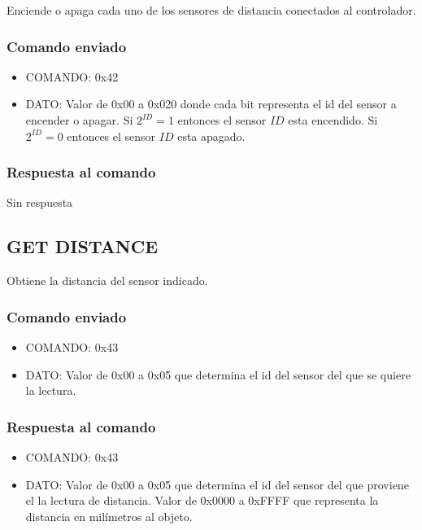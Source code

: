 \documentclass[a4paper,10pt]{article}
\begin{document}
Enciende o apaga cada uno de los sensores de distancia conectados al controlador.

\subsubsection*{Comando enviado}

\begin{itemize}
	\item{COMANDO:} 0x42
	\item{DATO:} Valor de 0x00 a 0x020 donde cada bit representa el id del sensor a encender o apagar.
	Si $2^{ID} = 1$ entonces el sensor $ID$ esta encendido.
	Si $2^{ID} = 0$ entonces el sensor $ID$ esta apagado.
\end{itemize}

\subsubsection*{Respuesta al comando}

Sin respuesta

\subsection{GET DISTANCE}
\label{get_distance_ds}

Obtiene la distancia del sensor indicado.

\subsubsection*{Comando enviado}

\begin{itemize}
	\item{COMANDO:} 0x43
	\item{DATO:} Valor de 0x00 a 0x05 que determina el id del sensor del que se quiere la lectura.
\end{itemize}

\subsubsection*{Respuesta al comando}

\begin{itemize}
	\item{COMANDO:} 0x43
	\item{DATO:} Valor de 0x00 a 0x05 que determina el id del sensor del que proviene el la lectura de distancia.
	Valor de 0x0000 a 0xFFFF que representa la distancia en mil\'imetros al objeto.
\end{itemize}
\end{document}
